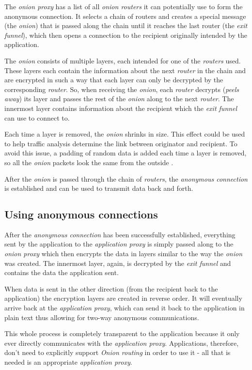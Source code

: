 \documentclass{sig-alternate}
\begin{document}
The \emph{onion proxy} has a list of all \emph{onion routers} it can potentially use to form
the anonymous connection. It selects a chain of routers and creates a special message (the \emph{onion})
that is passed along the chain until it reaches the last router (the \emph{exit funnel}), which then
opens a connection to the recipient originally intended by the application.

The \emph{onion} consists of multiple layers, each intended for one of the \emph{routers} used.
These layers each contain the information about the next \emph{router} in the chain and are encrypted
in such a way that each layer can only be decrypted by the corresponding \emph{router}. So, when receiving
the \emph{onion}, each \emph{router} decrypts (\emph{peels away}) its layer and passes the rest of the
\emph{onion} along to the next \emph{router}. The innermost layer contains information about the
recipient which the \emph{exit funnel} can use to connect to.

Each time a layer is removed, the \emph{onion} shrinks in size. This effect could be used to help traffic
analysis determine the link between originator and recipient. To avoid this issue, a padding of random data
is added each time a layer is removed, so all the \emph{onion} packets look the same from the
outside \cite{ren2009}.

After the \emph{onion} is passed through the chain of \emph{routers}, the \emph{anonymous connection}
is established and can be used to transmit data back and forth.

\subsection{Using anonymous connections}
After the \emph{anonymous connection} has been successfully established, everything sent by the application
to the \emph{application proxy} is simply passed along to the \emph{onion proxy} which then encrypts the
data in layers similar to the way the \emph{onion} was created. The innermost layer, again, is decrypted
by the \emph{exit funnel} and contains the data the application sent.

When data is sent in the other direction (from the recipient back to the application) the encryption layers
are created in reverse order. It will eventually arrive back at the \emph{application proxy}, which can send
it back to the application in plain text thus allowing for two-way anonymous communications.

This whole process is completely transparent to the application because it only ever directly communicates
with the \emph{application proxy}. Applications, therefore, don't need to explicitly support
\emph{Onion routing} in order to use it - all that is needed is an appropriate \emph{application proxy}.
\end{document}
